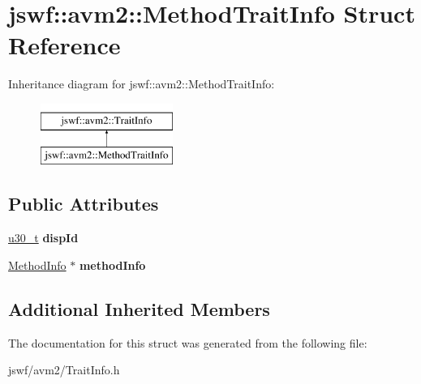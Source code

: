 \hypertarget{structjswf_1_1avm2_1_1_method_trait_info}{\section{jswf\+:\+:avm2\+:\+:Method\+Trait\+Info Struct Reference}
\label{structjswf_1_1avm2_1_1_method_trait_info}
}
Inheritance diagram for jswf\+:\+:avm2\+:\+:Method\+Trait\+Info\+:\begin{figure}[H]
\begin{center}
\leavevmode
\includegraphics[height=2.000000cm]{structjswf_1_1avm2_1_1_method_trait_info}
\end{center}
\end{figure}
\subsection*{Public Attributes}
\begin{DoxyCompactItemize}
\item 
\hypertarget{structjswf_1_1avm2_1_1_method_trait_info_a965cbb880396d3ce1040962a0de7ab91}{\hyperlink{namespacejswf_aa10d9ddca2a6a5debdc261dfae3d1117}{u30\+\_\+t} {\bfseries disp\+Id}}\label{structjswf_1_1avm2_1_1_method_trait_info_a965cbb880396d3ce1040962a0de7ab91}

\item 
\hypertarget{structjswf_1_1avm2_1_1_method_trait_info_a4fb0b7ba917a0fc7c87c20b17f0b5ce0}{\hyperlink{structjswf_1_1avm2_1_1_method_info}{Method\+Info} $\ast$ {\bfseries method\+Info}}\label{structjswf_1_1avm2_1_1_method_trait_info_a4fb0b7ba917a0fc7c87c20b17f0b5ce0}

\end{DoxyCompactItemize}
\subsection*{Additional Inherited Members}


The documentation for this struct was generated from the following file\+:\begin{DoxyCompactItemize}
\item 
jswf/avm2/Trait\+Info.\+h\end{DoxyCompactItemize}
